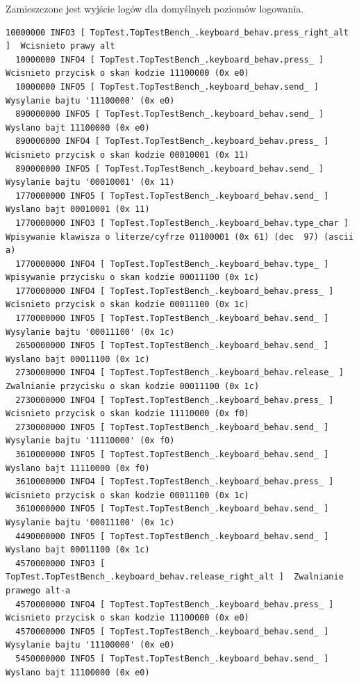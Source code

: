 \documentclass[a4paper,12pt]{article}
\begin{document}
Zamieszczone jest wyjście logów dla domyślnych poziomów logowania.
\begin{lstlisting}[label=Keyboard_output,caption=Keyboard logs output]
  10000000 INFO3 [ TopTest.TopTestBench_.keyboard_behav.press_right_alt ]  Wcisnieto prawy alt
  10000000 INFO4 [ TopTest.TopTestBench_.keyboard_behav.press_ ]  Wcisnieto przycisk o skan kodzie 11100000 (0x e0)
  10000000 INFO5 [ TopTest.TopTestBench_.keyboard_behav.send_ ]  Wysylanie bajtu '11100000' (0x e0)
  890000000 INFO5 [ TopTest.TopTestBench_.keyboard_behav.send_ ]  Wyslano bajt 11100000 (0x e0)
  890000000 INFO4 [ TopTest.TopTestBench_.keyboard_behav.press_ ]  Wcisnieto przycisk o skan kodzie 00010001 (0x 11)
  890000000 INFO5 [ TopTest.TopTestBench_.keyboard_behav.send_ ]  Wysylanie bajtu '00010001' (0x 11)
  1770000000 INFO5 [ TopTest.TopTestBench_.keyboard_behav.send_ ]  Wyslano bajt 00010001 (0x 11)
  1770000000 INFO3 [ TopTest.TopTestBench_.keyboard_behav.type_char ]  Wpisywanie klawisza o literze/cyfrze 01100001 (0x 61) (dec  97) (ascii a)
  1770000000 INFO4 [ TopTest.TopTestBench_.keyboard_behav.type_ ]  Wpisywanie przycisku o skan kodzie 00011100 (0x 1c)
  1770000000 INFO4 [ TopTest.TopTestBench_.keyboard_behav.press_ ]  Wcisnieto przycisk o skan kodzie 00011100 (0x 1c)
  1770000000 INFO5 [ TopTest.TopTestBench_.keyboard_behav.send_ ]  Wysylanie bajtu '00011100' (0x 1c)
  2650000000 INFO5 [ TopTest.TopTestBench_.keyboard_behav.send_ ]  Wyslano bajt 00011100 (0x 1c)
  2730000000 INFO4 [ TopTest.TopTestBench_.keyboard_behav.release_ ]  Zwalnianie przycisku o skan kodzie 00011100 (0x 1c)
  2730000000 INFO4 [ TopTest.TopTestBench_.keyboard_behav.press_ ]  Wcisnieto przycisk o skan kodzie 11110000 (0x f0)
  2730000000 INFO5 [ TopTest.TopTestBench_.keyboard_behav.send_ ]  Wysylanie bajtu '11110000' (0x f0)
  3610000000 INFO5 [ TopTest.TopTestBench_.keyboard_behav.send_ ]  Wyslano bajt 11110000 (0x f0)
  3610000000 INFO4 [ TopTest.TopTestBench_.keyboard_behav.press_ ]  Wcisnieto przycisk o skan kodzie 00011100 (0x 1c)
  3610000000 INFO5 [ TopTest.TopTestBench_.keyboard_behav.send_ ]  Wysylanie bajtu '00011100' (0x 1c)
  4490000000 INFO5 [ TopTest.TopTestBench_.keyboard_behav.send_ ]  Wyslano bajt 00011100 (0x 1c)
  4570000000 INFO3 [ TopTest.TopTestBench_.keyboard_behav.release_right_alt ]  Zwalnianie prawego alt-a
  4570000000 INFO4 [ TopTest.TopTestBench_.keyboard_behav.press_ ]  Wcisnieto przycisk o skan kodzie 11100000 (0x e0)
  4570000000 INFO5 [ TopTest.TopTestBench_.keyboard_behav.send_ ]  Wysylanie bajtu '11100000' (0x e0)
  5450000000 INFO5 [ TopTest.TopTestBench_.keyboard_behav.send_ ]  Wyslano bajt 11100000 (0x e0)

\end{lstlisting}
\end{document}
